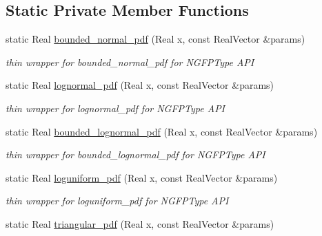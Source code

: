 \subsection*{Static Private Member Functions}
\begin{DoxyCompactItemize}
\item 
static Real \hyperlink{classPecos_1_1NumericGenOrthogPolynomial_a984945a7eb3ccfbb71c04afb58f004e6}{bounded\+\_\+normal\+\_\+pdf} (Real x, const Real\+Vector \&params)\label{classPecos_1_1NumericGenOrthogPolynomial_a984945a7eb3ccfbb71c04afb58f004e6}

\begin{DoxyCompactList}\small\item\em thin wrapper for bounded\+\_\+normal\+\_\+pdf for N\+G\+F\+P\+Type A\+PI \end{DoxyCompactList}\item 
static Real \hyperlink{classPecos_1_1NumericGenOrthogPolynomial_a0e518b41ad31d7637ca61353a49677e8}{lognormal\+\_\+pdf} (Real x, const Real\+Vector \&params)\label{classPecos_1_1NumericGenOrthogPolynomial_a0e518b41ad31d7637ca61353a49677e8}

\begin{DoxyCompactList}\small\item\em thin wrapper for lognormal\+\_\+pdf for N\+G\+F\+P\+Type A\+PI \end{DoxyCompactList}\item 
static Real \hyperlink{classPecos_1_1NumericGenOrthogPolynomial_a18a2e54f42d2d707515a8e3db7f300a3}{bounded\+\_\+lognormal\+\_\+pdf} (Real x, const Real\+Vector \&params)\label{classPecos_1_1NumericGenOrthogPolynomial_a18a2e54f42d2d707515a8e3db7f300a3}

\begin{DoxyCompactList}\small\item\em thin wrapper for bounded\+\_\+lognormal\+\_\+pdf for N\+G\+F\+P\+Type A\+PI \end{DoxyCompactList}\item 
static Real \hyperlink{classPecos_1_1NumericGenOrthogPolynomial_a531874fbf054cc3f2f54700e44476cf9}{loguniform\+\_\+pdf} (Real x, const Real\+Vector \&params)\label{classPecos_1_1NumericGenOrthogPolynomial_a531874fbf054cc3f2f54700e44476cf9}

\begin{DoxyCompactList}\small\item\em thin wrapper for loguniform\+\_\+pdf for N\+G\+F\+P\+Type A\+PI \end{DoxyCompactList}\item 
static Real \hyperlink{classPecos_1_1NumericGenOrthogPolynomial_a9d18b08dbb5c90ed33f9d8fb820fcf30}{triangular\+\_\+pdf} (Real x, const Real\+Vector \&params)\label{classPecos_1_1NumericGenOrthogPolynomial_a9d18b08dbb5c90ed33f9d8fb820fcf30}


\end{DoxyCompactItemize}

